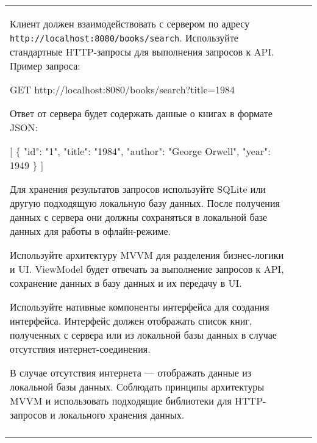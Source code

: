 \documentclass[a4paper]{article}
\begin{document}
\begin{tabular}{!{\vrule width 2pt}p{5cm}|p{6cm}|p{4cm}!{\vrule width 2pt}}
{\begin{minipage}{16cm}
\begin{enumerate}

Клиент должен взаимодействовать с сервером по адресу \texttt{http://localhost:8080/books/search}. Используйте стандартные HTTP-запросы для выполнения запросов к API. Пример запроса:

 GET http://localhost:8080/books/search?title=1984 

Ответ от сервера будет содержать данные о книгах в формате JSON:

 [ \{ "id": "1", "title": "1984", "author": "George Orwell", "year": 1949 \} ] 


Для хранения результатов запросов используйте SQLite или другую подходящую локальную базу данных. После получения данных с сервера они должны сохраняться в локальной базе данных для работы в офлайн-режиме.


Используйте архитектуру MVVM для разделения бизнес-логики и UI. ViewModel будет отвечать за выполнение запросов к API, сохранение данных в базу данных и их передачу в UI.


Используйте нативные компоненты интерфейса для создания интерфейса. Интерфейс должен отображать список книг, полученных с сервера или из локальной базы данных в случае отсутствия интернет-соединения.


В случае отсутствия интернета — отображать данные из локальной базы данных.
Соблюдать принципы архитектуры MVVM и использовать подходящие библиотеки для HTTP-запросов и локального хранения данных. 
\end{enumerate}

\vspace{0.2cm}
    
\end{minipage}
}
\\
\end{tabular}
\end{document}
